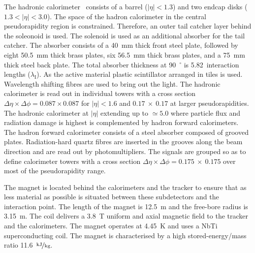 The hadronic calorimeter~\cite{HCAL_report} consists of a barrel ($\left|\eta\right|<1.3$) and two endcap disks ($1.3<\left|\eta\right|<3.0$). The space of the hadron calorimeter in the central pseudorapidity region is constrained. Therefore, an outer tail catcher layer behind the soleonoid is used. The solenoid is used as an additional absorber for the tail catcher. The absorber consists of a 40~mm thick front steel plate, followed by eight 50.5~mm thick brass plates, six 56.5~mm thick brass plates, and a 75~mm thick steel back plate. The total absorber thickness at 90~$^{\circ}$ is 5.82~interaction lengths ($\lambda_{\text{I}}$). As the active material plastic scintillator arranged in tiles is used. Wavelength shifting fibres are used to bring out the light. The hadronic calorimeter is read out in individual towers with a cross section $\Delta\eta\times\Delta\phi=0.087\times0.087$ for $\left|\eta\right|<1.6$ and $0.17~\times~0.17$ at larger pseudorapidities. The hadronic calorimeter at  $\left|\eta\right|$ extending up to $\simeq5.0$ where particle flux and radiation damage is highest is complemented by hadron forward calorimeters. The hadron forward calorimeter consists of a steel absorber composed of grooved plates. Radiation-hard quartz fibres are inserted in the grooves along the beam direction and are read out by photomultipliers. The signals are grouped so as to define calorimeter towers with a cross section $\Delta\eta\times\Delta\phi=0.175~\times~0.175$ over most of the pseudorapidity range. 

The magnet is located behind the calorimeters and the tracker to ensure that as less material as possible is situated between these subdetectors and the interaction point. The length of the magnet is 12.5~m and the free-bore radius is 3.15~m. The coil delivers a 3.8~T uniform and axial magnetic field to the tracker and the calorimeters. The magnet operates at 4.45~K and uses a NbTi superconducting coil. The magnet is characterised by a high stored-energy/mass ratio 11.6~$\nicefrac{\text{kJ}}{\text{kg}}$.

